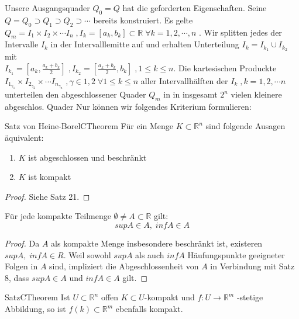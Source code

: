 
Unsere Ausgangsquader $ Q_0 = Q $ hat die geforderten Eigenschaften. Seine 
$ Q = Q_0 \supset Q_1 \supset Q_2 \supset \cdots$ bereits konstruiert. Es gelte $ Q_{m} = I_1 
\times I_2 \times \cdots I_{n} \; , I_{k} = \left[ a_{k}, b_{k} \right]  \subset \mathbb{R} \; 
\forall k = 1,2,\cdots, n$ . Wir splitten jedes der Intervalle $ I_{k} $ in der Intervalllemitte 
auf und erhalten Unterteilung $ I_{k} = I_{k_{1}} \cup I_{k_{2}} $ mit \\
$ I_{k_{1}} = \left[ a_{k}, \frac{a_{k}+ b_{k}}{2} \right] \; , I_{k_{2}} 
= \left[ \frac{a_{k}+ b_{k}}{2}, b_{k} \right] \; , 1 \leq k \leq n $. Die kartesischen Produckte
$ I_{1_{ \gamma_{1}}} \times I_{2_{ \gamma_{2}}} \times \cdots  I_{n_{ \gamma_{n}}} \; ,
\gamma \in {1,2} \; \forall 1 \leq k \leq n $ aller Intervallhälften der $ I_{k} \; , k = 1,2, \cdots n $ unterteilen den  abgeschlossener Quader $ Q_{m} $  in 
in insgesamt $ 2^{n} $  vielen kleinere abgeschlos. Quader  
Nur können wir folgendes Kriterium formulieren:
\begin{ibox}[25]{Satz von Heine-Borel}{CTheorem}
    Für ein Menge $ K \subset  \mathbb{R}^n  $ sind folgende Ausagen äquivalent:
	\begin{enumerate}[label=\alph*)]
		\item $ K $ ist abgeschlossen und beschränkt
		\item $ K $ ist kompakt
	\end{enumerate}
\end{ibox}

\begin{proof}
	Siehe Satz 21.
\end{proof}

Für jede kompakte Teilmenge $ \emptyset \neq A \subset \mathbb{R}  $ gilt:
$$ sup A \in A, \; inf A \in A $$
\begin{proof}
	Da $ A $ als kompakte Menge insbesondere beschränkt ist, existeren $ sup A, \; inf A \in R $.
	Weil sowohl $ sup A  $ als auch $ inf A $ Häufungspunkte geeigneter Folgen in $ A $ sind, 
	impliziert die Abgeschlossenheit von $ A $ in Verbindung mit Satz 8, dass $ sup A \in  A
	\text{ und } inf A \in A $ gilt.
\end{proof}

\begin{ibox}[26]{Satz}{CTheorem}
    Ist $ U \subset  \mathbb{R}^n  $ offen $ K \subset  U $-kompakt und $ f:U \to \mathbb{R}^m $
	-stetige Abbildung, so ist $ f(k) \subset \mathbb{R}^m $ ebenfalls kompakt.
\end{ibox}

